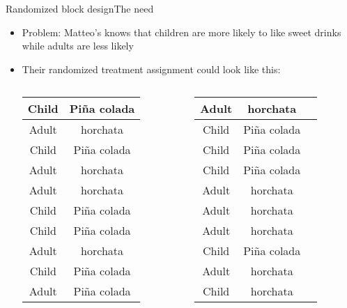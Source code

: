 \documentclass[xcolor=dvipsnames]{beamer}
\begin{document}
\begin{frame}{Randomized block design}{The need}
	\begin{itemize}
			\item Problem: Matteo's knows that children are more likely to like sweet drinks while adults are less likely \pause
			\item Their randomized treatment assignment could look like this: \vspace{-1mm} \pause
			\begin{columns}
				\begin{column}{.5\linewidth}
						\begin{flushright}
						\begin{tabular}{|c|c|}
							\hline 
						Child	& Pi\~{n}a colada \\ 
							\hline 
						Adult	& horchata \\ 
							\hline 
						Child	& Pi\~{n}a colada  \\ 
							\hline 
						Adult	& horchata \\ 
							\hline 
						Adult	& horchata \\ 
							\hline 
						Child	& Pi\~{n}a colada \\ 
							\hline 
						Child	& Pi\~{n}a colada \\ 
							\hline 
						Adult	& horchata \\ 
							\hline 
						Child	& Pi\~{n}a colada\\ 
							\hline 
						Adult	& Pi\~{n}a colada  \\ 
							\hline 
						\end{tabular} 
					\end{flushright}
				\end{column}
							\begin{column}{.5\linewidth}
				\begin{flushleft}
					\begin{tabular}{|c|c|c|}
						\hline 
					Adult	&  horchata\\ 
						\hline 
					Child	& Pi\~{n}a colada\\ 
						\hline 
					Child	& Pi\~{n}a colada  \\ 
						\hline 
					Child	& Pi\~{n}a colada \\ 
						\hline 
					Adult	& horchata \\ 
						\hline 
					Adult	& horchata \\ 
						\hline 
					Adult	& horchata \\ 
						\hline 
					Child	& Pi\~{n}a colada \\ 
						\hline 
					Adult	& horchata \\ 
						\hline 
					Child	& horchata\\ 
						\hline 
					\end{tabular} 
				\end{flushleft}
			\end{column}
			\end{columns}
	\end{itemize}
\end{frame}
\end{document}
